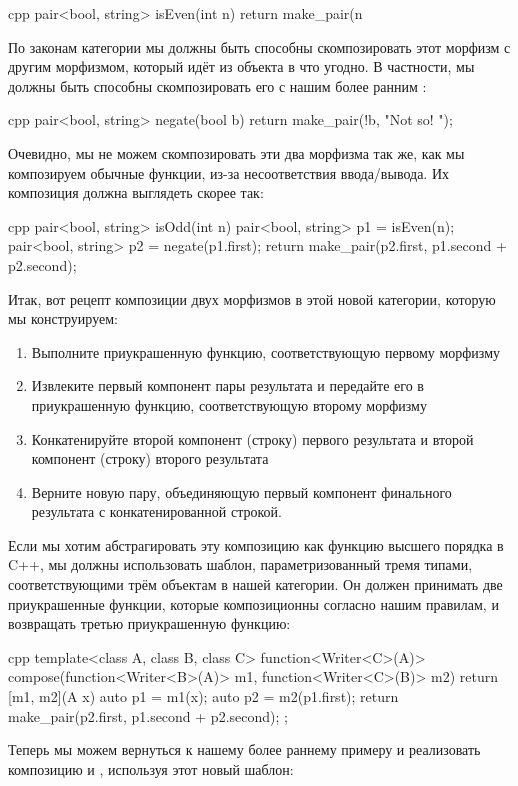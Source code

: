 \begin{snip}{cpp}
pair<bool, string> isEven(int n) {
    return make_pair(n %
}
\end{snip}
По законам категории мы должны быть способны скомпозировать этот морфизм
с другим морфизмом, который идёт из объекта  в
что угодно. В частности, мы должны быть способны скомпозировать его с нашим
более ранним :

\begin{snip}{cpp}
pair<bool, string> negate(bool b) {
    return make_pair(!b, "Not so! ");
}
\end{snip}
Очевидно, мы не можем скомпозировать эти два морфизма так же, как мы композируем
обычные функции, из-за несоответствия ввода/вывода. Их
композиция должна выглядеть скорее так:

\begin{snip}{cpp}
pair<bool, string> isOdd(int n) {
    pair<bool, string> p1 = isEven(n);
    pair<bool, string> p2 = negate(p1.first);
    return make_pair(p2.first, p1.second + p2.second);
}
\end{snip}
Итак, вот рецепт композиции двух морфизмов в этой новой
категории, которую мы конструируем:

\begin{enumerate}
  \tightlist
  \item
        Выполните приукрашенную функцию, соответствующую первому морфизму
  \item
        Извлеките первый компонент пары результата и передайте его в
        приукрашенную функцию, соответствующую второму морфизму
  \item
        Конкатенируйте второй компонент (строку) первого результата
        и второй компонент (строку) второго результата
  \item
        Верните новую пару, объединяющую первый компонент финального результата
        с конкатенированной строкой.
\end{enumerate}

Если мы хотим абстрагировать эту композицию как функцию высшего порядка в
C++, мы должны использовать шаблон, параметризованный тремя типами,
соответствующими трём объектам в нашей категории. Он должен принимать две
приукрашенные функции, которые композиционны согласно нашим правилам, и
возвращать третью приукрашенную функцию:

\begin{snip}{cpp}
template<class A, class B, class C>
function<Writer<C>(A)> compose(function<Writer<B>(A)> m1,
                               function<Writer<C>(B)> m2)
{
    return [m1, m2](A x) {
        auto p1 = m1(x);
        auto p2 = m2(p1.first);
        return make_pair(p2.first, p1.second + p2.second); 
    };
}
\end{snip}
Теперь мы можем вернуться к нашему более раннему примеру и реализовать композицию
 и , используя этот новый шаблон:

